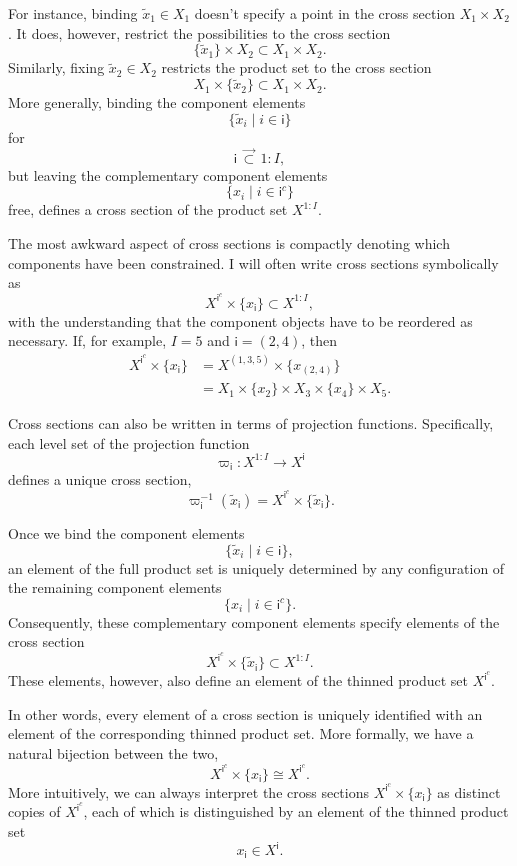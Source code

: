\documentclass[
  letterpaper,
  DIV=11,
  numbers=noendperiod]{scrartcl}
\begin{document}
For instance, binding \(\tilde{x}_{1} \in X_{1}\) doesn't specify a
point in the cross section \(X_{1} \times X_{2}\). It does, however,
restrict the possibilities to the cross section \[
\{ \tilde{x}_{1} \} \times X_{2} \subset X_{1} \times X_{2}.
\] Similarly, fixing \(\tilde{x}_{2} \in X_{2}\) restricts the product
set to the cross section \[
X_{1} \times \{ \tilde{x}_{2} \} \subset X_{1} \times X_{2}.
\] More generally, binding the component elements \[
\{ \tilde{x}_{i} \mid i \in \mathsf{i} \}
\] for \[
\mathsf{i} \, \vec{\subset} \, 1:I,
\] but leaving the complementary component elements \[
\{ x_{i} \mid i \in \mathsf{i}^{c} \}
\] free, defines a cross section of the product set \(X^{1:I}\).

The most awkward aspect of cross sections is compactly denoting which
components have been constrained. I will often write cross sections
symbolically as \[
X^{ \mathsf{i}^{c} } \times \{ x_{ \mathsf{i} } \}
\subset X^{1:I},
\] with the understanding that the component objects have to be
reordered as necessary. If, for example, \(I = 5\) and
\(\mathsf{i} = (2, 4)\), then \begin{align*}
X^{ \mathsf{i}^{c} } \times \{ x_{ \mathsf{i} } \}
&=
X^{ (1, 3, 5) } \times \{ x_{ (2, 4) } \}
\\
&=
X_{1} \times \{ x_{2} \} \times
X_{3} \times \{ x_{4} \} \times X_{5}.
\end{align*}

Cross sections can also be written in terms of projection functions.
Specifically, each level set of the projection function \[
\varpi_{ \mathsf{i} } : X^{1:I} \rightarrow X^{ \mathsf{i} }
\] defines a unique cross section, \[
\varpi_{ \mathsf{i} }^{-1} ( \tilde{x}_{ \mathsf{i} } )
=
X^{ \mathsf{i}^{c} } \times \{ \tilde{x}_{ \mathsf{i} } \}.
\]

Once we bind the component elements \[
\{ \tilde{x}_{i} \mid i \in \mathsf{i} \},
\] an element of the full product set is uniquely determined by any
configuration of the remaining component elements \[
\{ x_{i} \mid i \in \mathsf{i}^{c} \}.
\] Consequently, these complementary component elements specify elements
of the cross section \[
X^{ \mathsf{i}^{c} } \times \{ \tilde{x}_{ \mathsf{i} } \}
\subset X^{1:I}.
\] These elements, however, also define an element of the thinned
product set \(X^{ \mathsf{i}^{c} }\).

In other words, every element of a cross section is uniquely identified
with an element of the corresponding thinned product set. More formally,
we have a natural bijection between the two, \[
X^{ \mathsf{i}^{c} } \times \{ x_{ \mathsf{i} } \}
\cong
X^{ \mathsf{i}^{c} }.
\] More intuitively, we can always interpret the cross sections
\(X^{ \mathsf{i}^{c} } \times \{ x_{ \mathsf{i} } \}\) as distinct
copies of \(X^{ \mathsf{i}^{c} }\), each of which is distinguished by an
element of the thinned product set \[
x_{ \mathsf{i} } \in X^{ \mathsf{i} }.
\]
\end{document}
